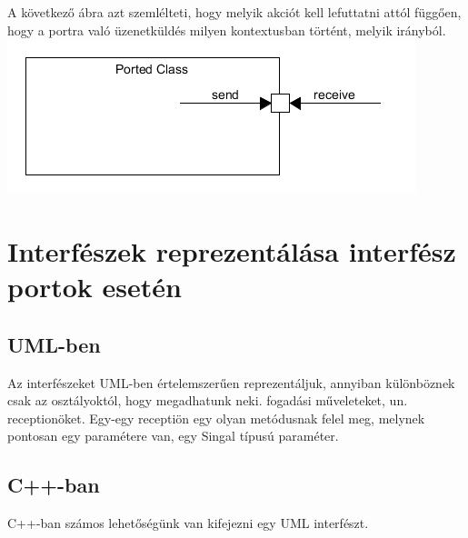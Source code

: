 \documentclass[a4paper,12pt]{report}
\begin{document}
A következő ábra azt szemlélteti, hogy melyik akciót kell lefuttatni attól függően, hogy a portra való üzenetküldés milyen kontextusban történt, melyik irányból. \\

\includegraphics[scale=0.8]{send_rec.png}

\section{Interfészek reprezentálása interfész portok esetén} \label{inf}
\subsection{UML-ben}
Az interfészeket UML-ben értelemszerűen reprezentáljuk, annyiban különböznek csak az osztályoktól, hogy megadhatunk neki. fogadási műveleteket, un. receptionöket. Egy-egy receptiön egy olyan metódusnak felel meg, melynek pontosan egy paramétere van, egy Singal típusú paraméter. 

\subsection{C++-ban}
C++-ban számos lehetőségünk van kifejezni egy UML interfészt.
\end{document}

